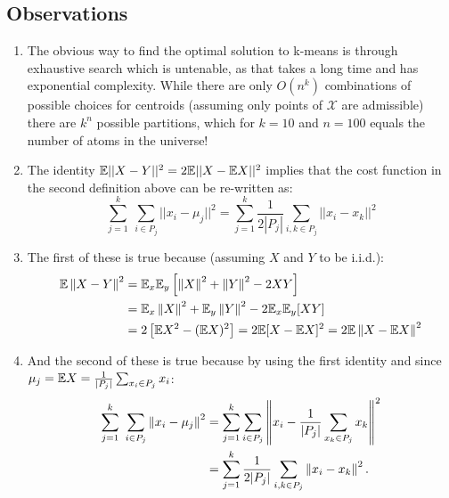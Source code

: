 \subsection{Observations}
\begin{enumerate}
\item The obvious way to find the optimal solution to k-means is
  through exhaustive search which is untenable, as that takes a long
  time and has exponential complexity. While there are only $O(n^k)$
  combinations of possible choices for centroids (assuming only points
  of $\mathcal{X}$ are admissible) there are $k^n$ possible
  partitions, which for $k=10$ and $n=100$ equals the number of atoms
  in the universe! 
\item The identity $\mathbb{E} || X - Y ||^2 = 2 \mathbb{E} || X- \mathbb{E} X ||^2$ implies
  that the cost function in the second definition above can be
  re-written as:  $$\sum_{j=1}^{k} \ \sum_{i\in P_j} || x_i - \mu_j ||
  ^2 = \sum_{j=1}^{k} \frac{1}{2 |P_j|} \sum_{i,k \in P_j} || x_i -
  x_k || ^2 $$ 
\item The first of these is true because (assuming $X$ and $Y$ to be
  i.i.d.): 
\begin{align*}
  \mathbb{E}\left\lVert X - Y\right\rVert^2 &= \mathbb{E}_x \mathbb{E}_{y} \left[\left\lVert X\right\rVert^2 + \left\lVert Y\right\rVert^2 - 2
    XY \right] \\ 
  &= \mathbb{E}_x \left\lVert X\right\rVert^2 + \mathbb{E}_y\left\lVert Y\right\rVert^2 -2 \mathbb{E}_x \mathbb{E}_y [ X Y ] \\
  &= 2 \left[ \mathbb{E} X^2 - (\mathbb{E} X)^2\right] = 2 \mathbb{E} [ X - \mathbb{E} X ]^2 = 2
  \mathbb{E}\left\lVert X- \mathbb{E} X\right\rVert^2 
\end{align*}
\item And the second of these is true because by using the first
  identity and since $\mu_j = \mathbb{E} X = \frac{1}{|P_j|} \sum_{x_i \in
    P_j} x_i$: 
\begin{align*}
	\sum_{j=1}^{k} \ \sum_{i\in P_j} \left\lVert x_i - \mu_j\right\rVert^2 &=
        \sum_{j=1}^{k}  \sum_{i\in P_j} \left\lVert x_i - \frac{1}{|P_j|}
        \sum_{x_k \in P_j} x_k\right\rVert^2 \\
        & = \sum_{j=1}^{k} \frac{1}{2 |P_j|} \sum_{i,k \in P_j}
        \left\lVert x_i - x_k\right\rVert^2.
\end{align*}
\end{enumerate}

